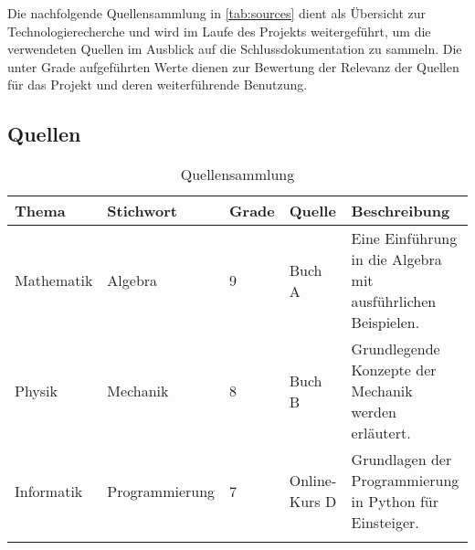 \documentclass[../main.tex]{subfiles}
\begin{document}
\noindent
Die nachfolgende Quellensammlung in \autoref{tab:sources} dient als Übersicht
zur Technologierecherche und wird im Laufe des Projekts
weitergeführt, um die verwendeten Quellen im Ausblick auf die
Schlussdokumentation zu sammeln. Die unter Grade aufgeführten Werte
dienen zur Bewertung der Relevanz der Quellen für das Projekt und
deren weiterführende Benutzung.

\subsection{Quellen}

\begin{table}[htbp]
  \centering
  \begin{tabularx}{\textwidth}{
      L{2cm}
      L{2.5cm}
      C{1cm}
      L{2.5cm}
      X
    }
    \toprule
    \textbf{Thema} & \textbf{Stichwort} & \textbf{Grade} &
    \textbf{Quelle} & \textbf{Beschreibung} \\
    \midrule
    \addlinespace[3pt]
    Mathematik & Algebra & 9 & Buch A & Eine Einführung in die
    Algebra mit ausführlichen Beispielen. \\
    \addlinespace[3pt]
    \hline
    \addlinespace[3pt]
    Physik & Mechanik & 8 & Buch B & Grundlegende Konzepte der
    Mechanik werden erläutert. \\
    \addlinespace[3pt]
    \hline
    \addlinespace[3pt]
    Informatik & Programmierung & 7 & Online-Kurs D & Grundlagen
    der Programmierung in Python für Einsteiger. \\
    \addlinespace[3pt]
    \bottomrule
  \end{tabularx}
  \caption{Quellensammlung}
  \label{tab:sources}
\end{table}
\end{document}
